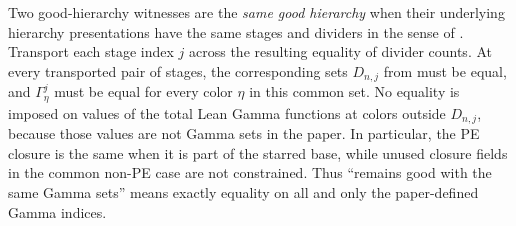 \begin{definition}
Two good-hierarchy witnesses are the \emph{same good hierarchy} when
their underlying hierarchy presentations have the same stages and
dividers in the sense of .  Transport each
stage index $j$ across the resulting equality of divider counts.  At
every transported pair of stages, the corresponding sets $D_{n,j}$
from  must be equal, and
$\Gamma^j_\eta$ must be equal for every color $\eta$ in this common
set.  No equality is imposed on values of the total Lean Gamma functions
at colors outside $D_{n,j}$, because those values are not Gamma sets in
the paper.  In particular, the PE closure is the same when it is part of
the starred base, while unused closure fields in the common non-PE case
are not constrained.  Thus “remains good with the same Gamma sets” means
exactly equality on all and only the paper-defined Gamma indices.
\end{definition}
